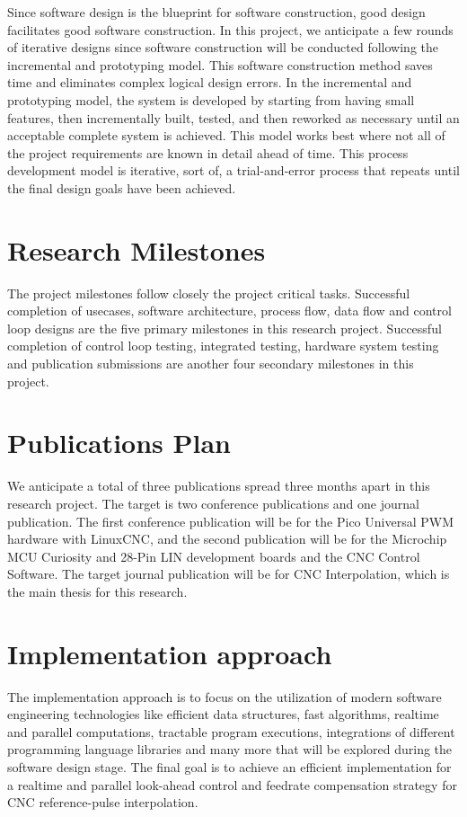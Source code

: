Since software design is the blueprint for software construction, good design facilitates good software construction. In this project, we anticipate a few rounds of iterative designs since software construction will be conducted following the incremental and prototyping model. This software construction method saves time and eliminates complex logical design errors. In the incremental and prototyping model, the system is developed by starting from having small features, then incrementally built, tested, and then reworked as necessary until an acceptable complete system is achieved. This model works best where not all of the project requirements are known in detail ahead of time. This process development model is iterative, sort of, a trial-and-error process that repeats until the final design goals have been achieved. 
	
\section{Research Milestones}
The project milestones follow closely the project critical tasks. Successful completion of usecases, software architecture, process flow, data flow and control loop designs are the five primary milestones in this research project. Successful completion of control loop testing, integrated testing, hardware system testing and publication submissions are another four secondary milestones in this project.  
	
\section{Publications Plan}

We anticipate a total of three publications spread three months apart in this research project. The target is two conference publications and one journal publication. The first conference publication will be for the Pico Universal PWM hardware with LinuxCNC, and the second publication will be for the Microchip MCU Curiosity and 28-Pin LIN development boards and the CNC Control Software. The target journal publication will be for CNC Interpolation, which is the main thesis for this research.

\section{Implementation approach}

The implementation approach is to focus on the utilization of modern software engineering technologies like efficient data structures, fast algorithms, realtime and parallel computations, tractable program executions, integrations of different programming language libraries and many more that will be explored during the software design stage. The final goal is to achieve an efficient implementation for a realtime and parallel look-ahead control and feedrate compensation strategy for CNC reference-pulse interpolation.

